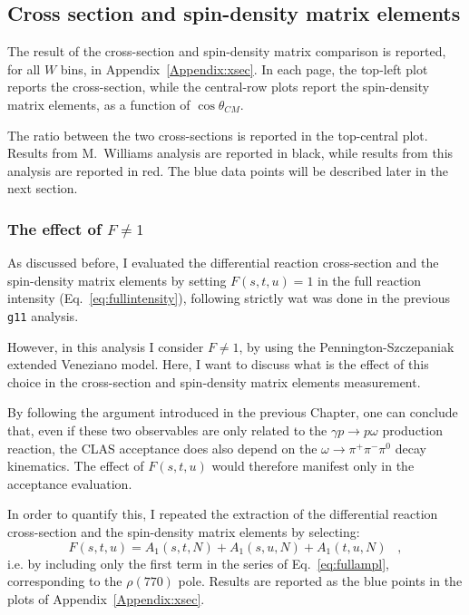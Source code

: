 \documentclass[a4paper,10pt]{report}
\newcommand{\decay}{$\omega \rightarrow \pi^+ \pi^- \pi^0$ }
\newcommand{\production}{$\gamma p \rightarrow p \omega$ }
\begin{document}
\subsection{Cross section and spin-density matrix elements}
The result of the cross-section and spin-density matrix comparison is reported, for all $W$ bins, in Appendix~\ref{Appendix:xsec}. In each page, the top-left plot reports the cross-section, while the central-row plots report the spin-density matrix elements, as a function of $\cos{\theta}_{CM}$.

The ratio between the two cross-sections is reported in the top-central plot. Results from M.~Williams analysis are reported in black, while results from this analysis are reported in red. The blue data points will be described later in the next section.


\subsubsection{The effect of $F\neq 1$}

As discussed before, I evaluated the differential reaction cross-section and the spin-density matrix elements by setting $F(s,t,u)=1$ in the full reaction intensity (Eq.~\ref{eq:fullintensity}), following strictly wat was done in the previous \texttt{g11} analysis.

However, in this analysis I consider $F \neq 1$, by using the Pennington-Szczepaniak extended Veneziano model. Here, I want to discuss what is the effect of this choice in the cross-section and spin-density matrix elements measurement. 

By following the argument introduced in the previous Chapter, one can conclude that, even if these two observables are only related to the \production production reaction, the CLAS acceptance does also depend on the \decay decay kinematics. The effect of $F(s,t,u)$ would therefore manifest only in the acceptance evaluation.

In order to quantify this, I repeated the extraction of the differential reaction cross-section and the spin-density matrix elements by selecting:
\begin{equation}
F(s,t,u)=A_1(s,t,N)+A_1(s,u,N)+A_1(t,u,N) \; \; \; ,
\end{equation}
i.e. by including only the first term in the series of Eq.~\ref{eq:fullampl}, corresponding to the $\rho(770)$ pole. Results are reported as the blue points in the plots of Appendix~\ref{Appendix:xsec}.
\end{document}

